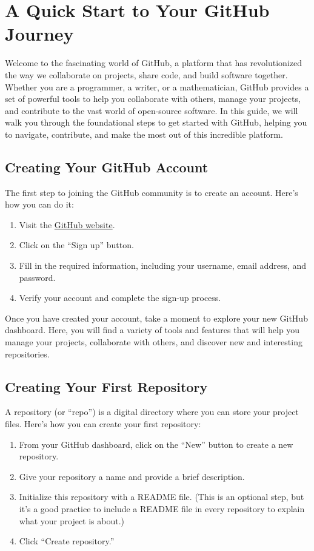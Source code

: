 \documentclass[a4paper,12pt]{book}
\begin{document}
\section*{A Quick Start to Your GitHub Journey}

Welcome to the fascinating world of GitHub, a platform that has revolutionized the way we collaborate on projects, share code, and build software together. Whether you are a programmer, a writer, or a mathematician, GitHub provides a set of powerful tools to help you collaborate with others, manage your projects, and contribute to the vast world of open-source software. In this guide, we will walk you through the foundational steps to get started with GitHub, helping you to navigate, contribute, and make the most out of this incredible platform.

\subsection*{Creating Your GitHub Account}

The first step to joining the GitHub community is to create an account. Here’s how you can do it:

\begin{enumerate}
    \item Visit the \href{https://github.com/}{GitHub website}.
    \item Click on the “Sign up” button.
    \item Fill in the required information, including your username, email address, and password.
    \item Verify your account and complete the sign-up process.
\end{enumerate}

Once you have created your account, take a moment to explore your new GitHub dashboard. Here, you will find a variety of tools and features that will help you manage your projects, collaborate with others, and discover new and interesting repositories.

\subsection*{Creating Your First Repository}

A repository (or “repo”) is a digital directory where you can store your project files. Here’s how you can create your first repository:

\begin{enumerate}
    \item From your GitHub dashboard, click on the “New” button to create a new repository.
    \item Give your repository a name and provide a brief description.
    \item Initialize this repository with a README file. (This is an optional step, but it’s a good practice to include a README file in every repository to explain what your project is about.)
    \item Click “Create repository.”
\end{enumerate}
\end{document}

